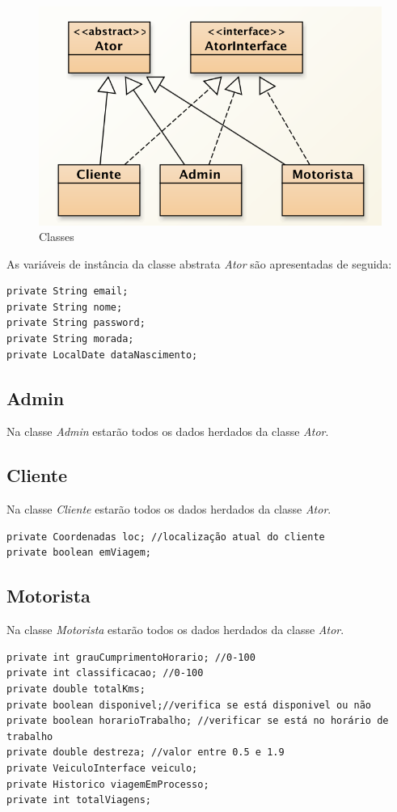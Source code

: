 \begin{figure}[htpb]
	\centering
	\includegraphics[scale=0.6]{imagem/atores}
	\caption{Classes }
	\label{p2:fig:p2_atoresr}
\end{figure}

As variáveis de instância da classe abstrata \textit{Ator} são apresentadas de seguida: 
\begin{verbatim}
private String email; 
private String nome; 
private String password; 
private String morada; 
private LocalDate dataNascimento; 
\end{verbatim}


\subsection{Admin}

Na classe \textit{Admin} estarão todos os dados herdados da classe \textit{Ator}. 


\subsection{Cliente}
Na classe \textit{Cliente} estarão todos os dados herdados da classe \textit{Ator}. 

\begin{verbatim}
private Coordenadas loc; //localização atual do cliente
private boolean emViagem;
\end{verbatim}
\subsection{Motorista}
Na classe \textit{Motorista} estarão todos os dados herdados da classe \textit{Ator}. 

\begin{verbatim}
private int grauCumprimentoHorario; //0-100
private int classificacao; //0-100
private double totalKms; 
private boolean disponivel;//verifica se está disponivel ou não 
private boolean horarioTrabalho; //verificar se está no horário de trabalho
private double destreza; //valor entre 0.5 e 1.9
private VeiculoInterface veiculo; 
private Historico viagemEmProcesso;
private int totalViagens;
\end{verbatim}

